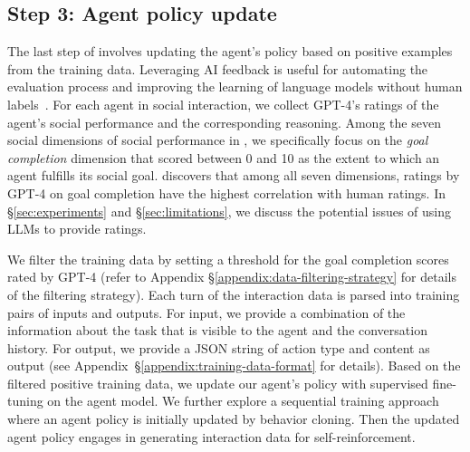 \subsection*{Step 3: Agent policy update}
\label{sec:agent_policy_update}
The last step of \model involves updating the agent's policy based on positive examples from the training data. 
Leveraging AI feedback is useful for automating the evaluation process and improving the learning of language models without human labels~\citep{bai2022constitutional}. For each agent in social interaction, we collect GPT-4's ratings of the agent's social performance and the corresponding reasoning. Among the seven social dimensions of social performance in \sotopiaeval, we specifically focus on the \emph{goal completion} dimension that scored between 0 and 10 as the extent to which an agent fulfills its social goal. \citet{sotopia} discovers that among all seven dimensions, ratings by GPT-4 on goal completion have the highest correlation with human ratings. 
In \S\ref{sec:experiments} and \S\ref{sec:limitations}, we discuss the potential issues of using LLMs to provide ratings.

We filter the training data by setting a threshold for the goal completion scores rated by GPT-4 (refer to Appendix \S\ref{appendix:data-filtering-strategy} for details of the filtering strategy). Each turn of the interaction data is parsed into training pairs of inputs and outputs. For input, we provide a combination of the information about the task that is visible to the agent and the conversation history. For output, we provide a JSON string of action type and content as output (see Appendix~\S\ref{appendix:training-data-format} for details). Based on the filtered positive training data, we update our agent's policy with supervised fine-tuning on the agent model. We further explore a sequential training approach where an agent policy is initially updated by behavior cloning. Then the updated agent policy engages in generating interaction data for self-reinforcement.

